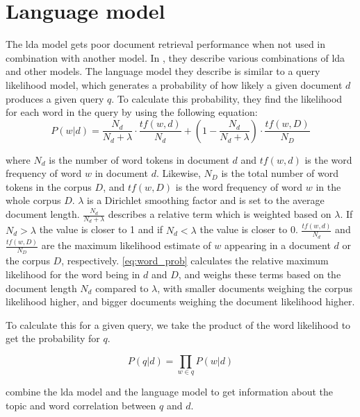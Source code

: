 \section{Language model}\label{sec:lm}
The \gls{lda} model gets poor document retrieval performance when not used in combination with another model\cite{yang2009topic}.
In \cite{yang2009topic}, they describe various combinations of \gls{lda} and other models. 
The language model they describe is similar to a query likelihood model, which generates a probability of how likely a given document $d$ produces a given query $q$.
To calculate this probability, they find the likelihood for each word in the query by using the following equation:
\begin{equation}\label{eq:word_prob}
	P(w|d) = \frac{N_d}{N_d + \lambda} \cdot \frac{tf(w,d)}{N_d} + (1 - \frac{N_d}{N_d + \lambda}) \cdot \frac{tf(w,D)}{N_D}
\end{equation}

where $N_d$ is the number of word tokens in document $d$ and $tf(w,d)$ is the word frequency of word $w$ in document $d$. Likewise, $N_D$ is the total number of word tokens in the corpus $D$, and $tf(w,D)$ is the word frequency of word $w$ in the whole corpus $D$. $\lambda$ is a Dirichlet smoothing factor and is set to the average document length.
$ \frac{N_d}{N_d + \lambda} $ describes a relative term which is weighted based on $ \lambda $. If $N_d > \lambda$ the value is closer to 1 and if $ N_d < \lambda $ the value is closer to 0.
$ \frac{tf(w,d)}{N_d} $ and $\frac{tf(w,D)}{N_D}$ are the maximum likelihood estimate of $w$ appearing in a document $d$ or the corpus $D$, respectively.
\autoref{eq:word_prob} calculates the relative maximum likelihood for the word being in $ d $ and $ D $, and weighs these terms based on the document length $N_d$ compared to $\lambda$, with smaller documents weighing the corpus likelihood higher, and bigger documents weighing the document likelihood higher.

To calculate this for a given query, we take the product of the word likelihood to get the probability for $q$.

\begin{equation}\label{eq:query_prob}
	P(q|d) = \prod_{w \in q} P(w|d)
\end{equation}

\cite{yang2009topic} combine the \gls{lda} model and the language model to get information about the topic and word correlation between $q$ and $d$.
